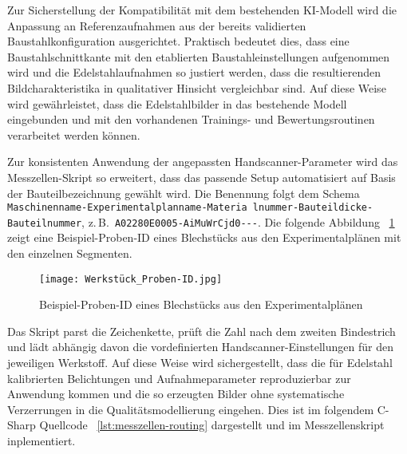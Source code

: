 Zur Sicherstellung der Kompatibilität mit dem bestehenden KI-Modell wird die Anpassung an Referenzaufnahmen aus der bereits validierten Baustahlkonfiguration ausgerichtet. Praktisch bedeutet dies, dass eine Baustahlschnittkante mit den etablierten Baustahleinstellungen aufgenommen wird und die Edelstahlaufnahmen so justiert werden, dass die resultierenden Bildcharakteristika in qualitativer Hinsicht vergleichbar sind. Auf diese Weise wird gewährleistet, dass die Edelstahlbilder in das bestehende Modell eingebunden und mit den vorhandenen Trainings- und Bewertungsroutinen verarbeitet werden können.

Zur konsistenten Anwendung der angepassten Handscanner-Parameter wird das Messzellen-Skript so erweitert, dass das passende Setup automatisiert auf Basis der Bauteilbezeichnung gewählt wird. Die Benennung folgt dem Schema
\texttt{Maschinenname-\allowbreak Experimentalplanname-\allowbreak Materia
lnummer-\allowbreak Bauteildicke-\allowbreak Bauteilnummer},
z.\,B.\ \texttt{A02280E0005-\allowbreak AiMuWrCjd0---}.
Die folgende Abbildung ~\ref{fig:probenID} zeigt eine Beispiel-Proben-ID eines Blechstücks aus den Experimentalplänen mit den einzelnen Segmenten.

\begin{figure}[htbp]
    \centering
    \texttt{[image: Werkstück\_Proben-ID.jpg]}
    \caption{Beispiel-Proben-ID eines Blechstücks aus den Experimentalplänen}
    \label{fig:probenID}
\end{figure}

Das Skript parst die Zeichenkette, prüft die Zahl nach dem zweiten Bindestrich und lädt abhängig davon die vordefinierten Handscanner-Einstellungen für den jeweiligen Werkstoff. Auf diese Weise wird sichergestellt, dass die für Edelstahl kalibrierten Belichtungen und Aufnahmeparameter reproduzierbar zur Anwendung kommen und die so erzeugten Bilder ohne systematische Verzerrungen in die Qualitätsmodellierung eingehen. Dies ist im folgendem C-Sharp Quellcode ~\ref{lst:messzellen-routing} dargestellt und im Messzellenskript inplementiert.

